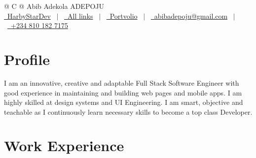 \documentclass[a4paper,12pt]{article}
\begin{document}
\pagestyle{empty} 



\begin{tabularx}{\linewidth}{@{} C @{}}
\Huge{Abib Adekola ADEPOJU} \\[7.5pt]
\href{https://github.com/harbystardev}{\raisebox{-0.05\height}\faGithub\ HarbyStarDev} \ $|$ \ 
\href{https://abibadekolalinks.netlify.app/}{\raisebox{-0.05\height}\faGlobe \ All links} \ $|$ \ 
\href{https://habbydevportfolio.netlify.app/}{\raisebox{-0.05\height}\faGlobe \ Portvolio} \ $|$ \ 
\href{mailto:abibadepoju@gmail.com}{\raisebox{-0.05\height}\faEnvelope \ abibadepoju@gmail.com} \ $|$ \ 
\href{tel:+2348101827175}{\raisebox{-0.05\height}\faMobile \ +234 810 182 7175} \\
\end{tabularx}


\section{Profile}
I am an innovative, creative and adaptable Full Stack Software Engineer with good experience in maintaining and building web pages and mobile apps. I am highly skilled at design systems and UI Engineering. I am smart, objective and teachable as I continuously learn necessary skills to become a top class Developer.

\section{Work Experience}
\end{document}
